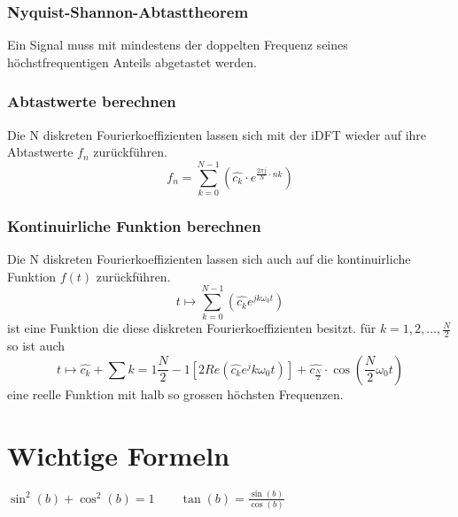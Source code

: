 \subsubsection{Nyquist-Shannon-Abtasttheorem}
Ein Signal muss mit mindestens der doppelten Frequenz seines höchstfrequentigen Anteils abgetastet werden.

\subsubsection{Abtastwerte berechnen}
Die N diskreten Fourierkoeffizienten lassen sich mit der iDFT wieder auf ihre Abtastwerte $f_n$ zurückführen.
$$f_n=\sum\limits_{k=0}^{N-1}(\hat{c_k}\cdot e^{\frac{2\pi j}{N}\cdot nk})$$
\subsubsection{Kontinuirliche Funktion berechnen}
Die N diskreten Fourierkoeffizienten lassen sich auch auf die kontinuirliche Funktion $f(t)$ zurückführen.
$$t\mapsto \sum\limits_{k=0}^{N-1}(\hat{c_k}e^{jk\omega_0t})$$ 
ist eine Funktion die diese diskreten Fourierkoeffizienten besitzt.
für $k=1,2,\ldots,\frac{N}{2}$ so ist auch 
$$t\mapsto\hat{c_k}+\sum\limits{k=1}{\frac{N}{2}-1}[2 
Re(\hat{c_k}e^jk\omega_0t)]+\hat{c_\frac{N}{2}}\cdot \cos(\frac{N}{2}\omega_0t)$$
eine reelle Funktion mit halb so grossen höchsten Frequenzen. 

\newpage
\label{LastPage}
\section{Wichtige Formeln}
	$\sin^2(b)+\cos^2(b)=1 \qquad \tan(b)=\frac{\sin(b)}{\cos(b)}$
	
	
